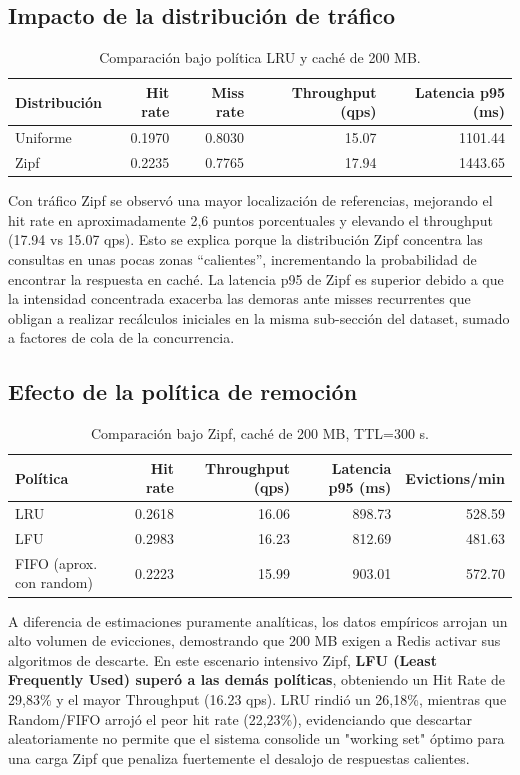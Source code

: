 \documentclass[letter,12pt]{article}
\begin{document}
\subsection{Impacto de la distribución de tráfico}
\begin{table}[H]
\centering
\begin{tabular}{lrrrr}
\toprule
Distribución & Hit rate & Miss rate & Throughput (qps) & Latencia p95 (ms) \\
\midrule
Uniforme & 0.1970 & 0.8030 & 15.07 & 1101.44 \\
Zipf & 0.2235 & 0.7765 & 17.94 & 1443.65 \\
\bottomrule
\end{tabular}
\caption{Comparación bajo política LRU y caché de 200 MB.}
\end{table}

Con tráfico Zipf se observó una mayor localización de referencias, mejorando el hit rate en aproximadamente 2,6 puntos porcentuales y elevando el throughput (17.94 vs 15.07 qps). Esto se explica porque la distribución Zipf concentra las consultas en unas pocas zonas ``calientes'', incrementando la probabilidad de encontrar la respuesta en caché. La latencia p95 de Zipf es superior debido a que la intensidad concentrada exacerba las demoras ante misses recurrentes que obligan a realizar recálculos iniciales en la misma sub-sección del dataset, sumado a factores de cola de la concurrencia.

\subsection{Efecto de la política de remoción}
\begin{table}[H]
\centering
\begin{tabular}{lrrrr}
\toprule
Política & Hit rate & Throughput (qps) & Latencia p95 (ms) & Evictions/min \\
\midrule
LRU & 0.2618 & 16.06 & 898.73 & 528.59 \\
LFU & 0.2983 & 16.23 & 812.69 & 481.63 \\
FIFO (aprox. con random) & 0.2223 & 15.99 & 903.01 & 572.70 \\
\bottomrule
\end{tabular}
\caption{Comparación bajo Zipf, caché de 200 MB, TTL=300 s.}
\end{table}

A diferencia de estimaciones puramente analíticas, los datos empíricos arrojan un alto volumen de evicciones, demostrando que 200 MB exigen a Redis activar sus algoritmos de descarte. En este escenario intensivo Zipf, \textbf{LFU (Least Frequently Used) superó a las demás políticas}, obteniendo un Hit Rate de 29,83\% y el mayor Throughput (16.23 qps). LRU rindió un 26,18\%, mientras que Random/FIFO arrojó el peor hit rate (22,23\%), evidenciando que descartar aleatoriamente no permite que el sistema consolide un "working set" óptimo para una carga Zipf que penaliza fuertemente el desalojo de respuestas calientes.
\end{document}
